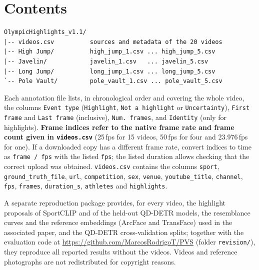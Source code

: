 \documentclass[11pt,a4paper]{article}
\begin{document}
\section*{Contents}
\begin{verbatim}
OlympicHighlights_v1.1/
|-- videos.csv          sources and metadata of the 20 videos
|-- High Jump/          high_jump_1.csv ... high_jump_5.csv
|-- Javelin/            javelin_1.csv   ... javelin_5.csv
|-- Long Jump/          long_jump_1.csv ... long_jump_5.csv
`-- Pole Vault/         pole_vault_1.csv ... pole_vault_5.csv
\end{verbatim}
Each annotation file lists, in chronological order and covering the whole video, the columns \texttt{Event type} (\texttt{Highlight}, \texttt{Not a highlight} or \texttt{Uncertainty}), \texttt{First frame} and \texttt{Last frame} (inclusive), \texttt{Num.\ frames}, and \texttt{Identity} (only for highlights). \textbf{Frame indices refer to the native frame rate and frame count given in \texttt{videos.csv}} (25\,fps for 15 videos, 50\,fps for four and 23.976\,fps for one). If a downloaded copy has a different frame rate, convert indices to time as \texttt{frame / fps} with the listed \texttt{fps}; the listed duration allows checking that the correct upload was obtained. \texttt{videos.csv} contains the columns \texttt{sport}, \texttt{ground\_truth\_file}, \texttt{url}, \texttt{competition}, \texttt{sex}, \texttt{venue}, \texttt{youtube\_title}, \texttt{channel}, \texttt{fps}, \texttt{frames}, \texttt{duration\_s}, \texttt{athletes} and \texttt{highlights}.

A separate reproduction package provides, for every video, the highlight proposals of SportCLIP and of the held-out QD-DETR models, the resemblance curves and the reference embeddings (ArcFace and TransFace) used in the associated paper, and the QD-DETR cross-validation splits; together with the evaluation code at \url{https://github.com/MarcosRodrigoT/PVS} (folder \texttt{revision/}), they reproduce all reported results without the videos. Videos and reference photographs are not redistributed for copyright reasons.
\end{document}
